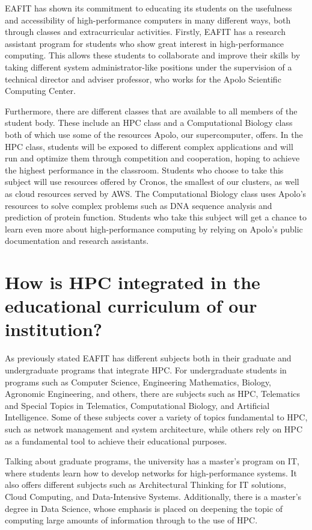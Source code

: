 \documentclass[11pt,a4paper,twocolumn]{article}
\begin{document}
EAFIT has shown its commitment to educating its students on the usefulness and accessibility of high-performance computers in many different ways, both through classes and extracurricular activities. Firstly, EAFIT has a research assistant program for students who show great interest in high-performance computing. This allows these students to collaborate and improve their skills by taking different system administrator-like positions under the supervision of a technical director and adviser professor, who works for the Apolo Scientific Computing Center. 

Furthermore, there are different classes that are available to all members of the student body. These include an HPC class and a Computational Biology class both of which use some of the resources Apolo, our supercomputer, offers. In the HPC class, students will be exposed to different complex applications and will run and optimize them through competition and cooperation, hoping to achieve the highest performance in the classroom. Students who choose to take this subject will use resources offered by Cronos, the smallest of our clusters, as well as cloud resources served by AWS. The Computational Biology class uses Apolo’s resources to solve complex problems such as DNA sequence analysis and prediction of protein function. Students who take this subject will get a chance to learn even more about high-performance computing by relying on Apolo's public documentation and research assistants.

\section{How is HPC integrated in the educational curriculum of our institution?}

As previously stated EAFIT has different subjects both in their graduate and undergraduate programs that integrate HPC. For undergraduate students in programs such as Computer Science, Engineering Mathematics, Biology, Agronomic Engineering, and others, there are subjects such as HPC, Telematics and Special Topics in Telematics, Computational Biology, and Artificial Intelligence. Some of these subjects cover a variety of topics fundamental to HPC, such as network management and system architecture, while others rely on HPC as a fundamental tool to achieve their educational purposes.

Talking about graduate programs, the university has a master's program on IT, where students learn how to develop networks for high-performance systems. It also offers different subjects such as Architectural Thinking for IT solutions, Cloud Computing, and Data-Intensive Systems. Additionally, there is a master’s degree in Data Science, whose emphasis is placed on deepening the topic of computing large amounts of information through to the use of HPC. 
\end{document}
